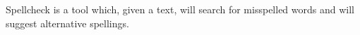 Spellcheck is a tool which, given a text, will search for misspelled words and will suggest alternative spellings. 